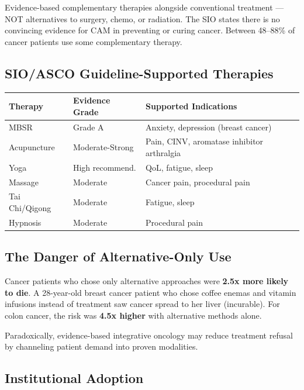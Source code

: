 Evidence-based complementary therapies alongside conventional treatment
--- NOT alternatives to surgery, chemo, or radiation. The SIO states
there is no convincing evidence for CAM in preventing or curing cancer.
Between 48--88\% of cancer patients use some complementary therapy.

\subsection{SIO/ASCO Guideline-Supported
Therapies}\label{sioasco-guideline-supported-therapies}

\begin{longtable}{p{4cm}p{3cm}p{6.5cm}}
\toprule
\textbf{Therapy} & \textbf{Evidence Grade} & \textbf{Supported Indications} \\
\midrule
MBSR & Grade A & Anxiety, depression (breast cancer) \\
Acupuncture & Moderate-Strong & Pain, CINV, aromatase inhibitor arthralgia \\
Yoga & High recommend. & QoL, fatigue, sleep \\
Massage & Moderate & Cancer pain, procedural pain \\
Tai Chi/Qigong & Moderate & Fatigue, sleep \\
Hypnosis & Moderate & Procedural pain \\
\bottomrule
\end{longtable}

\subsection{The Danger of Alternative-Only
Use}\label{the-danger-of-alternative-only-use}

Cancer patients who chose only alternative approaches were \textbf{2.5x
more likely to die}. A 28-year-old breast cancer patient who chose
coffee enemas and vitamin infusions instead of treatment saw cancer
spread to her liver (incurable). For colon cancer, the risk was
\textbf{4.5x higher} with alternative methods alone.

Paradoxically, evidence-based integrative oncology may reduce treatment
refusal by channeling patient demand into proven modalities.

\subsection{Institutional Adoption}\label{institutional-adoption}

